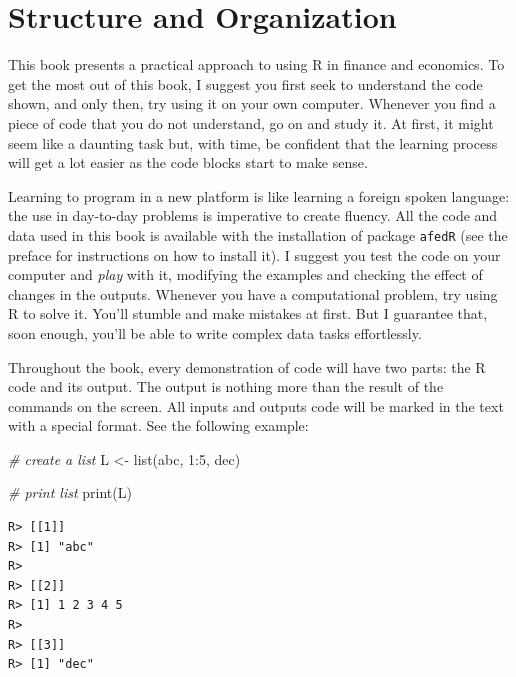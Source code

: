 \documentclass[
  12pt,
]{book}
\newenvironment{Shaded}{\begin{snugshade}}{\end{snugshade}}
\newcommand{\CommentTok}[1]{\textcolor[rgb]{0.37,0.37,0.37}{\textit{#1}}}
\newcommand{\DecValTok}[1]{\textcolor[rgb]{0.06,0.06,0.06}{#1}}
\newcommand{\FunctionTok}[1]{\textcolor[rgb]{0,0,0}{#1}}
\newcommand{\NormalTok}[1]{#1}
\newcommand{\OtherTok}[1]{\textcolor[rgb]{0.37,0.37,0.37}{#1}}
\newcommand{\SpecialCharTok}[1]{\textcolor[rgb]{0,0,0}{#1}}
\newcommand{\StringTok}[1]{\textcolor[rgb]{0.5,0.5,0.5}{#1}}
\begin{document}
\hypertarget{structure-and-organization}{%
\section{Structure and Organization}\label{structure-and-organization}}

This book presents a practical approach to using R in finance and economics. To get the most out of this book, I suggest you first seek to understand the code shown, and only then, try using it on your own computer. Whenever you find a piece of code that you do not understand, go on and study it. At first, it might seem like a daunting task but, with time, be confident that the learning process will get a lot easier as the code blocks start to make sense.

Learning to program in a new platform is like learning a foreign spoken language: the use in day-to-day problems is imperative to create fluency. All the code and data used in this book is available with the installation of package \texttt{afedR} (see the preface for instructions on how to install it). I suggest you test the code on your computer and \emph{play} with it, modifying the examples and checking the effect of changes in the outputs. Whenever you have a computational problem, try using R to solve it. You'll stumble and make mistakes at first. But I guarantee that, soon enough, you'll be able to write complex data tasks effortlessly.

Throughout the book, every demonstration of code will have two parts: the R code and its output. The output is nothing more than the result of the commands on the screen. All inputs and outputs code will be marked in the text with a special format. See the following example:

\begin{Shaded}
\begin{Highlighting}[]
\CommentTok{\# create a list}
\NormalTok{L }\OtherTok{\textless{}{-}} \FunctionTok{list}\NormalTok{(}\StringTok{\textquotesingle{}abc\textquotesingle{}}\NormalTok{, }\DecValTok{1}\SpecialCharTok{:}\DecValTok{5}\NormalTok{, }\StringTok{\textquotesingle{}dec\textquotesingle{}}\NormalTok{)}

\CommentTok{\# print list}
\FunctionTok{print}\NormalTok{(L)}
\end{Highlighting}
\end{Shaded}

\begin{verbatim}
R> [[1]]
R> [1] "abc"
R> 
R> [[2]]
R> [1] 1 2 3 4 5
R> 
R> [[3]]
R> [1] "dec"
\end{verbatim}
\end{document}
